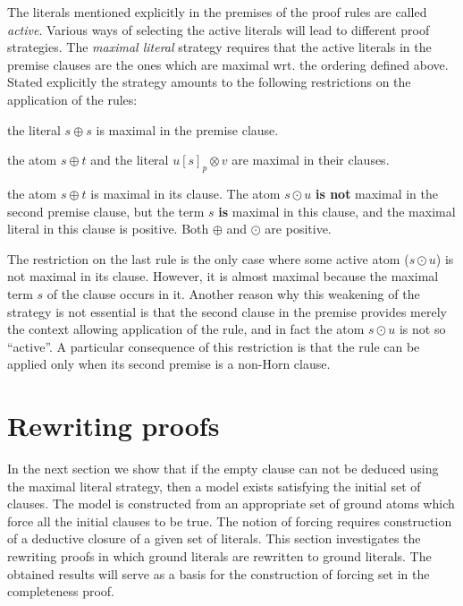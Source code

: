 The
literals
mentioned explicitly in the premises of the proof rules are called
{\em active}. Various ways of selecting the active
literals will lead to
different proof strategies. The {\em maximal literal} strategy
requires that the active
literals in the premise clauses are the ones
which are maximal wrt. the ordering defined above.
Stated explicitly the strategy amounts
to the following restrictions on the application of the rules:
\begin{description}\MyLPar
\item[Reflexivity resolution:] the literal \(s\oplus s\) is maximal 
in the premise clause.
\item [Superposition:]
the atom \(s\oplus t\) and the literal \(u[s]_p\otimes v\)
are maximal in their clauses.
\item [Compositionality resolution:] the atom \(s\oplus t\) is maximal
in its clause. The atom \(s\odot u\) {\bf is not} maximal in 
the second premise clause,
but the term $s$ {\bf is} maximal in this clause,  
and the maximal literal in this clause is positive. Both \(\oplus\) and
\(\odot\) are positive.
\end{description}

The restriction on the last rule is the only case where some active atom
($s\odot u$) is not maximal in its clause. However, it is almost
maximal because the maximal term $s$ of the clause occurs in it.  Another
reason why this weakening of the strategy is not essential is that 
the second
clause in the premise provides merely the context allowing application
of the rule, and in fact the atom $s\odot u$ is not so ``active''. 
A particular consequence of this restriction is that the rule can be applied only
when its second premise is a non-Horn clause.


\section{Rewriting proofs} \label{se:rewrite}

In the next section we show that if the empty clause can not be deduced using 
the maximal literal strategy, then a model exists satisfying the initial set of 
clauses. The model is constructed from an appropriate set of ground atoms 
which force all the initial clauses to be true. The notion of forcing requires 
construction of a deductive closure of a given set of literals. This section 
investigates the rewriting proofs in which ground literals are rewritten to 
ground literals. The obtained results will serve as a basis for the 
construction of forcing set in the completeness proof.

